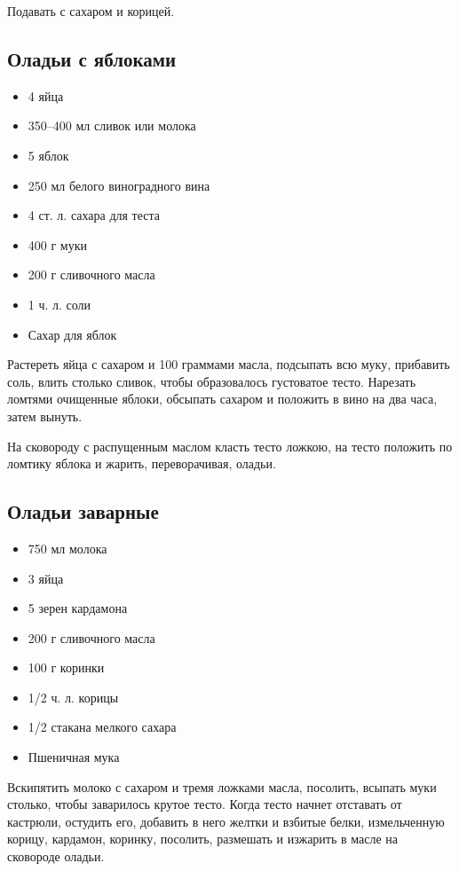 Подавать с сахаром и корицей.

\subsection{Оладьи с яблоками}

\begin{itemize}
	\item 4 яйца
    \item 350–400 мл сливок или молока
    \item 5 яблок
    \item 250 мл белого виноградного вина
    \item 4 ст. л. сахара для теста
    \item 400 г муки
    \item 200 г сливочного масла 
    \item 1 ч. л. соли
    \item Сахар для яблок
\end{itemize}

Растереть яйца с сахаром и 100 граммами масла, подсыпать всю муку, прибавить соль, влить столько сливок, чтобы образовалось густоватое тесто. Нарезать ломтями очищенные яблоки, обсыпать сахаром и положить в вино на два часа, затем вынуть.

На сковороду с распущенным маслом класть тесто ложкою, на тесто положить по ломтику яблока и жарить, переворачивая, оладьи.

\subsection{Оладьи заварные}

\begin{itemize}
	\item 750 мл молока
    \item 3 яйца
    \item 5 зерен кардамона
    \item 200 г сливочного масла 
    \item 100 г коринки
    \item 1/2 ч. л. корицы
    \item 1/2 стакана мелкого сахара
    \item Пшеничная мука
\end{itemize}

Вскипятить молоко с сахаром и тремя ложками масла, посолить, всыпать муки столько, чтобы заварилось крутое тесто. Когда тесто начнет отставать от кастрюли, остудить его, добавить в него желтки и взбитые белки, измельченную корицу, кардамон, коринку, посолить, размешать и изжарить в масле на сковороде оладьи.

